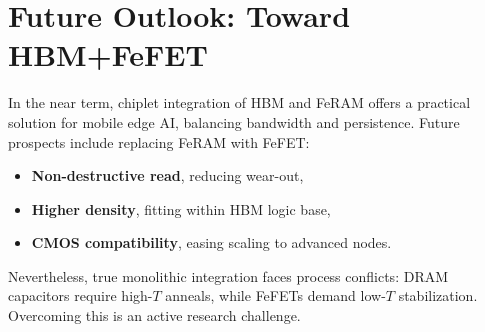 \section{Future Outlook: Toward HBM+FeFET}
In the near term, chiplet integration of HBM and FeRAM offers a practical solution for mobile edge AI, balancing bandwidth and persistence. 
Future prospects include replacing FeRAM with FeFET:
\begin{itemize}
  \item \textbf{Non-destructive read}, reducing wear-out,
  \item \textbf{Higher density}, fitting within HBM logic base,
  \item \textbf{CMOS compatibility}, easing scaling to advanced nodes.
\end{itemize}

Nevertheless, true monolithic integration faces process conflicts: DRAM capacitors require high-$T$ anneals, while FeFETs demand low-$T$ stabilization. 
Overcoming this is an active research challenge.


